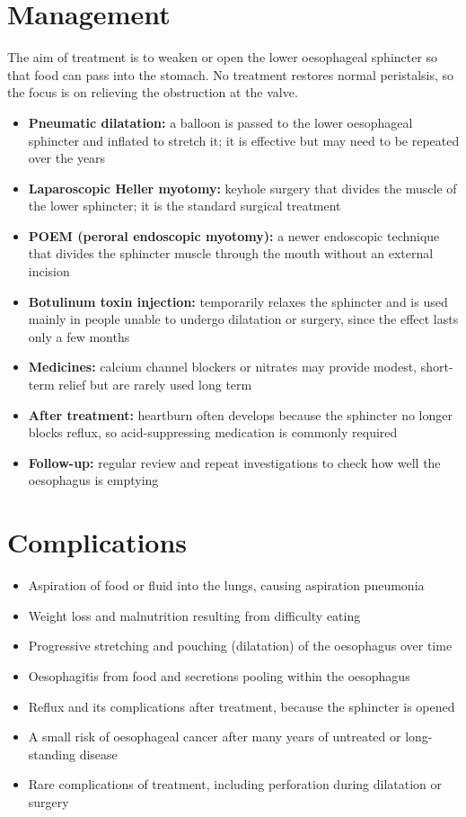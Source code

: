 \section*{Management}
The aim of treatment is to weaken or open the lower oesophageal sphincter so that food can pass into the stomach. No treatment restores normal peristalsis, so the focus is on relieving the obstruction at the valve.

\begin{itemize}
    \item \textbf{Pneumatic dilatation:} a balloon is passed to the lower oesophageal sphincter and inflated to stretch it; it is effective but may need to be repeated over the years
    \item \textbf{Laparoscopic Heller myotomy:} keyhole surgery that divides the muscle of the lower sphincter; it is the standard surgical treatment
    \item \textbf{POEM (peroral endoscopic myotomy):} a newer endoscopic technique that divides the sphincter muscle through the mouth without an external incision
    \item \textbf{Botulinum toxin injection:} temporarily relaxes the sphincter and is used mainly in people unable to undergo dilatation or surgery, since the effect lasts only a few months
    \item \textbf{Medicines:} calcium channel blockers or nitrates may provide modest, short-term relief but are rarely used long term
    \item \textbf{After treatment:} heartburn often develops because the sphincter no longer blocks reflux, so acid-suppressing medication is commonly required
    \item \textbf{Follow-up:} regular review and repeat investigations to check how well the oesophagus is emptying
\end{itemize}

\section*{Complications}
\begin{itemize}
    \item Aspiration of food or fluid into the lungs, causing aspiration pneumonia
    \item Weight loss and malnutrition resulting from difficulty eating
    \item Progressive stretching and pouching (dilatation) of the oesophagus over time
    \item Oesophagitis from food and secretions pooling within the oesophagus
    \item Reflux and its complications after treatment, because the sphincter is opened
    \item A small risk of oesophageal cancer after many years of untreated or long-standing disease
    \item Rare complications of treatment, including perforation during dilatation or surgery
\end{itemize}

